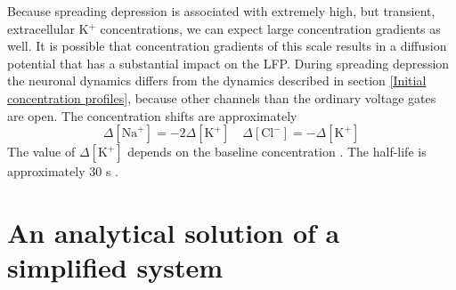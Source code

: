 \documentclass{uiophd}
\begin{document}
Because spreading depression is associated with extremely high, but transient, extracellular K$^+$ concentrations, we can expect large concentration gradients as well. It is possible that concentration gradients of this scale results in a diffusion potential that has a substantial impact on the LFP. During spreading depression the neuronal dynamics differs from the dynamics described in section \ref{Initial concentration profiles}, because other channels than the ordinary voltage gates are open. The concentration shifts are approximately 
$$\Delta [\text{Na}^+] = -2\Delta [\text{K}^+] \quad \Delta [\text{Cl}^-] = -\Delta[\text{K}^+]$$ 
The value of $\Delta [\text{K}^+]$ depends on the baseline concentration \cite{Herreras1993} \cite{Ataya2015}. The half-life is approximately 30 s \cite{Ataya2015}.

\section{An analytical solution of a simplified system}
\end{document}
